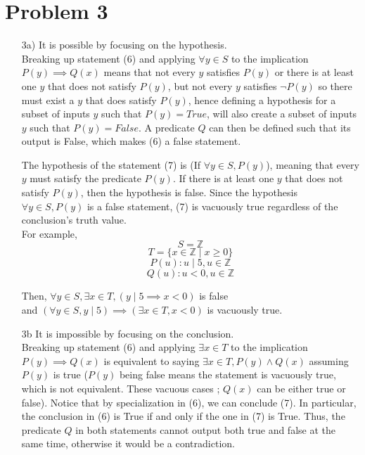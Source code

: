 \documentclass[12pt]{exam}
\begin{document}
\newpage
\section{Problem 3}
\begin{itemize}
    \item[3a)]It is possible by focusing on the hypothesis. \\
    Breaking up statement (6) and applying $\forall y \in S$ to the implication $P(y) \implies Q(x)$ means that not every $y$ satisfies $P(y)$ or there is at least one $y$ that does not satisfy $P(y)$, but not every $y$ satisfies $\lnot P(y)$ so there must exist a $y$ that does satisfy $P(y)$, hence defining a hypothesis for a subset of inputs $y$ such that $P(y) = True$, will also create a subset of inputs $y$ such that $P(y) = False$. A predicate $Q$ can then be defined such that its output is False, which makes (6) a false statement.
    \newline
    
    The hypothesis of the statement (7) is (If $\forall y \in S, P(y)$), meaning that every $y$ must satisfy the predicate $P(y)$. If there is at least one $y$ that does not satisfy $P(y)$, then the hypothesis is false. Since the hypothesis $\forall y \in S, P(y)$ is a false statement, (7) is vacuously true regardless of the conclusion's truth value. \\
    For example, $$S = \mathbb{Z}$$
    $$T = \{x \in \mathbb{Z} \mid x \geq 0\}$$ 
    $$P(u) : u \mid 5, u \in \mathbb{Z}$$ 
    $$Q(u) : u < 0, u \in \mathbb{Z}$$
    
    Then, $\forall y \in S, \exists x \in T, (y \mid 5 \implies x < 0)$ is false \\
    and $(\forall y \in S, y \mid 5) \implies (\exists x \in T, x < 0)$ is vacuously true.
    \item[3b]It is impossible by focusing on the conclusion. \\
    Breaking up statement (6) and applying $\exists x \in T$ to the implication $P(y) \implies Q(x)$ is equivalent to saying $\exists x \in T, P(y) \land Q(x)$ assuming $P(y)$ is true ($P(y)$ being false means the statement is vacuously true, which is not equivalent. These vacuous cases ; $Q(x)$ can be either true or false). 
    Notice that by specialization in (6), we can conclude (7). In particular, the conclusion in (6) is True if and only if the one in (7) is True. Thus, the predicate $Q$ in both statements cannot output both true and false at the same time, otherwise it would be a contradiction.
\end{itemize}
\end{document}
